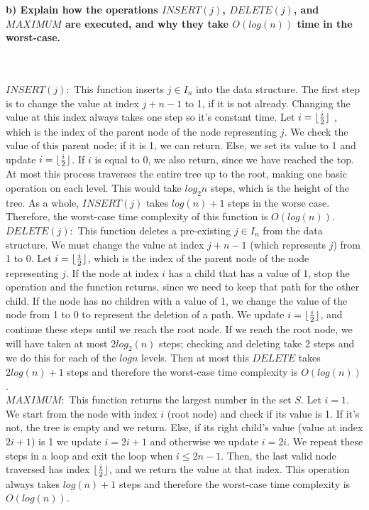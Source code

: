 \documentclass[20pt]{article}
\DeclarePairedDelimiter\floor{\lfloor}{\rfloor}
\begin{document}
\noindent
\textbf{b) Explain how the operations $INSERT(j)$, $DELETE(j)$, and $MAXIMUM$ are executed, and why they take
$O(log(n))$ time in the worst-case.}

\noindent
\begin{text}
    \\\\
    $INSERT(j):$ This function inserts $j \in I_n$ into the data structure. The first step is to change the value at index $j + n - 1$ to 1, if it is not already. Changing the value at this index always takes one step so it's constant time. Let $i = \floor{\frac{i}{2}}$ , which is the index of the parent node of the node representing $j$. We check the value of this parent node; if it is 1, we can return. Else, we set its value to 1 and update $i = \floor{\frac{i}{2}}$. If $i$ is equal to 0, we also return, since we have reached the top. At most this process traverses the entire tree up to the root, making one basic operation on each level. This would take $log_{2}n$ steps, which is the height of the tree. As a whole, $INSERT(j)$ takes $log(n) + 1$ steps in the worse case. Therefore, the worst-case time complexity of this function is $O(log(n))$.\\
    
    \noindent
    $DELETE(j):$ This function deletes a pre-existing $j \in I_n$ from the data structure. We must change the value at index $j + n -1$ (which represents $j$) from 1 to 0. Let $i = \floor{\frac{i}{2}}$, which is the index of the parent node of the node representing $j$. If the node at index $i$ has a child that has a value of 1, stop the operation and the function returns, since we need to keep that path for the other child. If the node has no children with a value of 1, we change the value of the node from 1 to 0 to represent the deletion of a path. We update $i = \floor{\frac{i}{2}}$, and continue these steps until we reach the root node. If we reach the root node, we will have taken at most $2log_{2}(n)$ steps; checking and deleting take 2 steps and we do this for each of the $log n$ levels. Then at most this $DELETE$ takes $2log(n) + 1$ steps and therefore the worst-case time complexity is $O(log(n))$.\\

    \noindent
    $MAXIMUM:$ This function returns the largest number in the set $S$. Let $i = 1$. We start from the node with index $i$ (root node) and check if its value is 1. If it's not, the tree is empty and we return. Else, if its right child's value (value at index $2i + 1$) is 1 we update $i = 2i + 1$ and otherwise we update $i = 2i$. We repeat these steps in a loop and exit the loop when $i \leq 2n - 1$. Then, the last valid node traversed has index $\floor{\frac{i}{2}}$, and we return the value at that index. This operation always takes $log(n) + 1$ steps and therefore the worst-case time complexity is $O(log(n))$.\\
\end{text}
\end{document}
